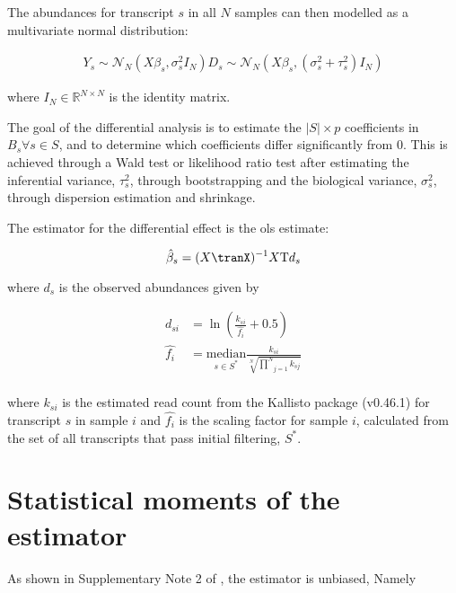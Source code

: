 The abundances for transcript $s$ in all $N$ samples can then modelled as a multivariate normal distribution:

\begin{align}
  Y_{s} \sim \mathcal{N}_N(X \beta_s, \sigma_s^2 I_{N})
  D_{s} \sim \mathcal{N}_N(X \beta_s, (\sigma_s^2 + \tau_s^2)I_{N})
\end{align}

where $I_N \in \mathbb{R}^{N \times N}$ is the identity matrix.

The goal of the differential analysis is to estimate the $|S| \times p$ coefficients in $B_s \forall s \in S$, and to determine which coefficients differ significantly from 0.
This is achieved through a Wald test or likelihood ratio test after estimating the inferential variance, $\tau_s^2$, through bootstrapping and the biological variance, $\sigma_s^2$, through dispersion estimation and shrinkage.

The estimator for the differential effect is the \gls{ols} estimate:

\begin{equation*}
  \hat{\beta}_s = (X\tranX)^{-1} X\tran d_s
\end{equation*}

where $d_s$ is the observed abundances given by

\begin{align*}
  d_{si}    & = \ln \left(\frac{k_{si}}{\hat{f_i}} + 0.5 \right)                                                           \\
  \hat{f_i} & = \underset{s \in S^*}{\mathrm{median}} \frac{k_{si}}{\sqrt[N]{\underset{j = 1}{\overset{N}{\prod }}k_{sj}}} \\
\end{align*}

where $k_{si}$ is the estimated read count from the Kallisto package (v0.46.1) \cite{brayNearoptimalProbabilisticRNAseq2016} for transcript $s$ in sample $i$ and $\hat{f_i}$ is the scaling factor for sample $i$, calculated from the set of all transcripts that pass initial filtering, $S^*$.

\section{Statistical moments of the  estimator}

As shown in Supplementary Note 2 of \cite[REF][]{pimentelDifferentialAnalysisRNAseq2017}, the estimator is unbiased, Namely

